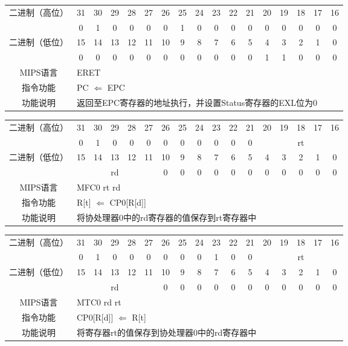 \begin{table}
\begin{tabular}{|c|c|c|c|c|c|c|c|c|c|c|c|c|c|c|c|c|}
\hline
\multirow{2}{*}{二进制（高位）} &
31&30&29&28&27&26&25&24&23&22&21&20&19&18&17&16\\
\cline{2-17}
&
0&1&0&0&0&
0&1&0&0&0&
0&0&0&0&0&
0\\
\hline
\multirow{2}{*}{二进制（低位）} &
15&14&13&12&11&10&9&8&7&6&5&4&3&2&1&0\\
\cline{2-17}
&
0&0&0&0&0&
0&0&0&0&0&
0&1&1&0&0&
0\\
\hline
MIPS语言&
\multicolumn{16}{l|}{ERET}\\
\hline
指令功能&
\multicolumn{16}{l|}{PC $\Leftarrow$ EPC}\\
\hline
功能说明&
\multicolumn{16}{l|}{返回至EPC寄存器的地址执行，并设置Status寄存器的EXL位为0}\\
\hline
\end{tabular}
\end{table}

\begin{table}
\begin{tabular}{|c|c|c|c|c|c|c|c|c|c|c|c|c|c|c|c|c|}
\hline
\multirow{2}{*}{二进制（高位）} &
31&30&29&28&27&26&25&24&23&22&21&20&19&18&17&16\\
\cline{2-17}
&
0&1&0&0&0&
0&0&0&0&0&
0&
\multicolumn{5}{c|}{rt}\\
\hline
\multirow{2}{*}{二进制（低位）} &
15&14&13&12&11&10&9&8&7&6&5&4&3&2&1&0\\
\cline{2-17}
&
\multicolumn{5}{c|}{rd} &
0&0&0&0&0&
0&0&0&0&0&
0\\
\hline
MIPS语言&
\multicolumn{16}{l|}{MFC0 rt rd}\\
\hline
指令功能&
\multicolumn{16}{l|}{R[t] $\Leftarrow$ CP0[R[d]]}\\
\hline
功能说明&
\multicolumn{16}{l|}{将协处理器0中的rd寄存器的值保存到rt寄存器中}\\
\hline
\end{tabular}
\end{table}

\begin{table}
\begin{tabular}{|c|c|c|c|c|c|c|c|c|c|c|c|c|c|c|c|c|}
\hline
\multirow{2}{*}{二进制（高位）} &
31&30&29&28&27&26&25&24&23&22&21&20&19&18&17&16\\
\cline{2-17}
&
0&1&0&0&0&
0&0&0&1&0&
0&
\multicolumn{5}{c|}{rt}\\
\hline
\multirow{2}{*}{二进制（低位）} &
15&14&13&12&11&10&9&8&7&6&5&4&3&2&1&0\\
\cline{2-17}
&
\multicolumn{5}{c|}{rd} &
0&0&0&0&0&
0&0&0&0&0&
0\\
\hline
MIPS语言&
\multicolumn{16}{l|}{MTC0 rd rt}\\
\hline
指令功能&
\multicolumn{16}{l|}{CP0[R[d]] $\Leftarrow$ R[t]}\\
\hline
功能说明&
\multicolumn{16}{l|}{将寄存器rt的值保存到协处理器0中的rd寄存器中}\\
\hline
\end{tabular}
\end{table}


